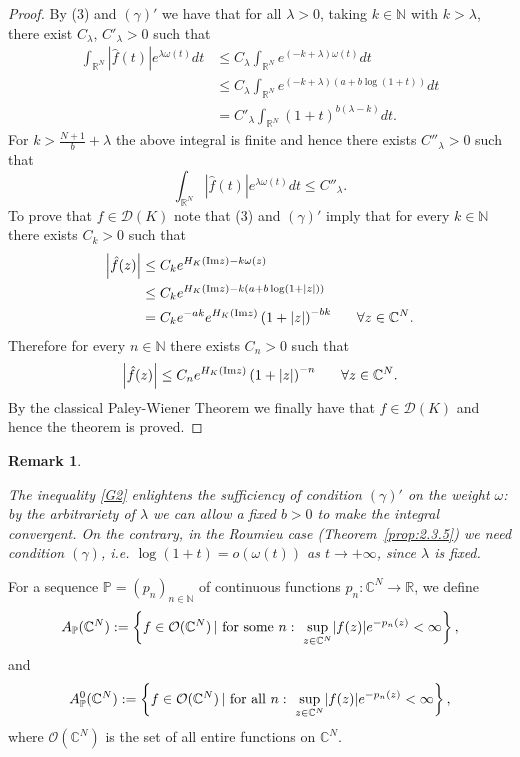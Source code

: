 \documentclass[twoside]{amsart}
\newtheorem{Rem}[Th]{Remark}
\begin{document}
\begin{proof}
By (3) and $(\gamma)'$ we have that for all $\lambda>0$, taking
$k\in{\mathbb N}$ with $k>\lambda$, there exist $C_{\lambda},\,C'_{\lambda}>0$
such that
\begin{align}
\nonumber
\int_{{\mathbb R}^N}|\hat{f}(t)|e^{\lambda\omega(t)}dt & 
\leq C_{\lambda}\int_{{\mathbb R}^N}e^{(-k+\lambda)\omega(t)}dt\\
\label{G2}
 & \leq C_{\lambda}\int_{{\mathbb R}^N}e^{(-k+\lambda)\left(a+b\log(1+t)\right)}dt\\
\nonumber
 & =C'_{\lambda}\int_{{\mathbb R}^N}(1+t)^{b(\lambda-k)}dt.
\end{align}
For ${\displaystyle k>\frac{N+1}{b}+\lambda}$ the above integral
is finite and hence there exists $C''_{\lambda}>0$ such that 
\[
\int_{{\mathbb R}^N}|\hat{f}(t)|e^{\lambda\omega(t)}dt\leq C''_{\lambda}.
\]
To prove that $f\in{\mathcal{D}}(K)$ note that (3) and $(\gamma)'$ imply
that for every $k\in{\mathbb N}$ there exists $C_{k}>0$ such that 
\begin{align*}
\left|\hat{f}(z)\right| & \leq C_{k}e^{H_{K}({\mathop{\rm Im}\nolimits} z)-k\omega(z)}\\
 & \leq C_{k}e^{H_{K}({\mathop{\rm Im}\nolimits} z)-k\left(a+b\log(1+|z|)\right)}\\
 & =C_{k}e^{-ak}e^{H_{K}({\mathop{\rm Im}\nolimits} z)}\left(1+|z|\right)^{-bk}
\,\,\,\,\,\,\,\,\,\,\forall z\in\mathbb{C}^{N}.
\end{align*}
Therefore for every $n\in{\mathbb N}$ there exists $C_{n}>0$ such that
\[
\left|\hat{f}(z)\right|\leq C_{n}
e^{H_{K}({\mathop{\rm Im}\nolimits} z)}\left(1+|z|\right)^{-n}
\,\,\,\,\,\,\,\,\,\,\forall z\in\mathbb{C}^{N}.
\]
By the classical Paley-Wiener Theorem  we finally
have that $f\in{\mathcal{D}}(K)$ and hence the theorem is proved. 
\end{proof}

\begin{Rem}
\begin{em}
The inequality \eqref{G2} enlightens the sufficiency of condition $(\gamma)'$
on the weight $\omega$: by the arbitrariety of $\lambda$ we can allow a fixed 
$b>0$ to make the integral convergent. On the contrary, in the Roumieu
case (Theorem~\ref{prop:2.3.5}) we need condition $(\gamma)$, i.e.
$\log(1+t)=o(\omega(t))$ as 
$t\to+\infty$, since $\lambda$ is fixed.
\end{em}
\end{Rem}

For a sequence $\mathbb{P}=(p_{n})_{n\in{\mathbb N}}$ of continuous functions
$p_{n}:\mathbb{C}^{N}\rightarrow\mathbb{R}$, we define
\[
A_{\mathbb{P}}(\mathbb{C}^{N}):=\left\{ f\in{\mathcal O}(\mathbb{C}^{N})\,|\,
\mbox{\,for some\,\,}n:\,\,\underset{z\in\mathbb{C}^{N}}{\sup}
|f(z)|e^{-p_{n}(z)}<\infty\right\} ,
\]
and
\[
A_{\mathbb{P}}^{0}(\mathbb{C}^{N}):=\left\{ f\in{\mathcal O}(\mathbb{C}^{N})\,|\,
\mbox{\,for all\,\,}n:\,\,\underset{z\in\mathbb{C}^{N}}{\sup}|f(z)|
e^{-p_{n}(z)}<\infty\right\} ,
\]
where ${\mathcal O}(\mathbb{C}^{N})$ is the set of all entire functions
on $\mathbb{C}^{N}$.
\end{document}
